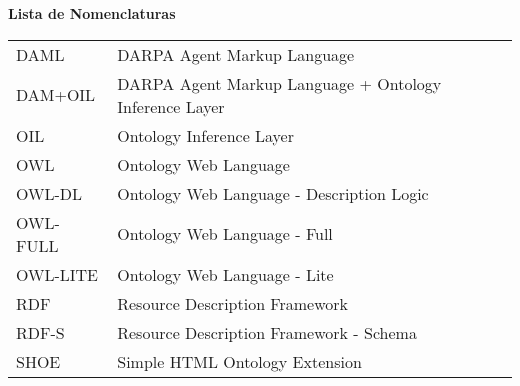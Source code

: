 \begin{flushright}
   \fontsize{16}{16}\selectfont \textbf{Lista de Nomenclaturas}
\end{flushright}
\vspace{60pt}
\begin{tabular}{ll}
DAML     & DARPA Agent Markup Language \\
DAM+OIL  & DARPA Agent Markup Language + Ontology Inference Layer \\
OIL      & Ontology Inference Layer \\
OWL      & Ontology Web Language \\
OWL-DL   & Ontology Web Language - Description Logic \\
OWL-FULL & Ontology Web Language - Full \\
OWL-LITE & Ontology Web Language - Lite \\
RDF      & Resource Description Framework \\
RDF-S    & Resource Description Framework - Schema \\
SHOE     & Simple HTML Ontology Extension \\
\end{tabular}
